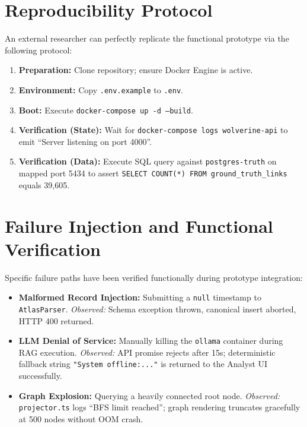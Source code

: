 \section{Reproducibility Protocol}
\label{sec:exp-protocol}
An external researcher can perfectly replicate the functional prototype via the following protocol:
\begin{enumerate}
    \item \textbf{Preparation:} Clone repository; ensure Docker Engine is active.
    \item \textbf{Environment:} Copy \texttt{.env.example} to \texttt{.env}.
    \item \textbf{Boot:} Execute \texttt{docker-compose up -d --build}.
    \item \textbf{Verification (State):} Wait for \texttt{docker-compose logs wolverine-api} to emit ``Server listening on port 4000''.
    \item \textbf{Verification (Data):} Execute SQL query against \texttt{postgres-truth} on mapped port 5434 to assert \texttt{SELECT COUNT(*) FROM ground\_truth\_links} equals 39,605.
\end{enumerate}

\section{Failure Injection and Functional Verification}
\label{sec:exp-failures}
Specific failure paths have been verified functionally during prototype integration:
\begin{itemize}
    \item \textbf{Malformed Record Injection:} Submitting a \texttt{null} timestamp to \texttt{AtlasParser}. \textit{Observed:} Schema exception thrown, canonical insert aborted, HTTP 400 returned.
    \item \textbf{LLM Denial of Service:} Manually killing the \texttt{ollama} container during RAG execution. \textit{Observed:} API promise rejects after 15s; deterministic fallback string \texttt{"System offline:..."} is returned to the Analyst UI successfully.
    \item \textbf{Graph Explosion:} Querying a heavily connected root node. \textit{Observed:} \texttt{projector.ts} logs ``BFS limit reached''; graph rendering truncates gracefully at 500 nodes without OOM crash.
\end{itemize}
